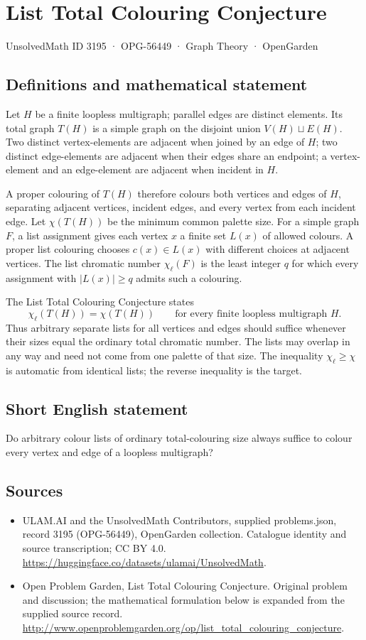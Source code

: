 \documentclass[11pt,a4paper]{article}
\begin{document}
\section*{List Total Colouring Conjecture}\label{3195}
{\small UnsolvedMath ID 3195 · OPG-56449 · Graph Theory · OpenGarden}
\subsection{Definitions and mathematical statement}
Let $H$ be a finite loopless multigraph; parallel
edges are distinct elements. Its total graph
$T(H)$ is a simple graph on the disjoint union
$V(H)\sqcup E(H)$. Two distinct vertex-elements
are adjacent when joined by an edge of $H$;
two distinct edge-elements are adjacent when
their edges share an endpoint; a vertex-element
and an edge-element are adjacent when incident
in $H$.

A proper colouring of $T(H)$ therefore colours
both vertices and edges of $H$, separating
adjacent vertices, incident edges, and every
vertex from each incident edge. Let
$\chi(T(H))$ be the minimum common palette size.
For a simple graph $F$, a list assignment gives
each vertex $x$ a finite set $L(x)$ of allowed
colours. A proper list colouring chooses
$c(x)\in L(x)$ with different choices at
adjacent vertices. The list chromatic number
$\chi_\ell(F)$ is the least integer $q$ for
which every assignment with $|L(x)|\geq q$
admits such a colouring.

The List Total Colouring Conjecture states
\[
 \chi_\ell(T(H))=\chi(T(H))
 \qquad\text{for every finite loopless multigraph }H.
\]
Thus arbitrary separate lists for all vertices
and edges should suffice whenever their sizes
equal the ordinary total chromatic number.
The lists may overlap in any way and need not
come from one palette of that size. The inequality
$\chi_\ell\geq\chi$ is automatic from identical
lists; the reverse inequality is the target.
\subsection{Short English statement}
Do arbitrary colour lists of ordinary total-colouring size always suffice to colour every vertex and edge of a loopless multigraph?
\subsection{Sources}
\begin{itemize}
\item[S1] ULAM.AI and the UnsolvedMath Contributors, supplied problems.json, record 3195 (OPG-56449), OpenGarden collection. Catalogue identity and source transcription; CC BY 4.0.
\url{https://huggingface.co/datasets/ulamai/UnsolvedMath}.
\item[S2] Open Problem Garden, List Total Colouring Conjecture. Original problem and discussion; the mathematical formulation below is expanded from the supplied source record.
\url{http://www.openproblemgarden.org/op/list_total_colouring_conjecture}.
\end{itemize}
\end{document}

